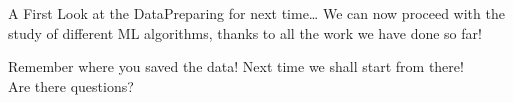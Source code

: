 \begin{frame}{A First Look at the Data}{Preparing for next time\dots}
    We can now proceed with the study of different ML algorithms, thanks to all the work we have done so far!
    \vfill \pause
    \begin{center}
        \huge
        Remember where you saved the data! Next time we shall start from there!
        \\[2em]
        Are there questions?
    \end{center}
    \vfill
\end{frame}

